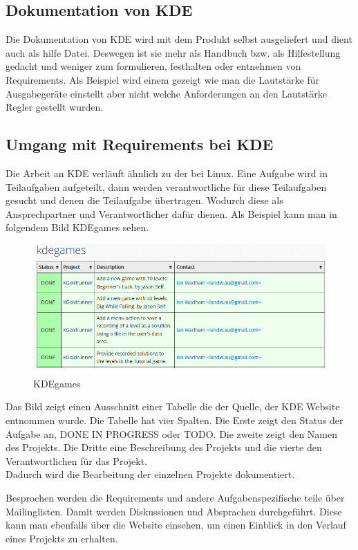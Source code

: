 \documentclass[10pt,a4paper,twocolumn]{article}
\begin{document}
\subsection{Dokumentation von KDE}
Die Dokumentation von KDE wird mit dem Produkt selbst ausgeliefert und dient
auch als hilfe Datei. Deswegen ist sie mehr als Handbuch bzw. als Hilfestellung
gedacht und weniger zum formulieren, festhalten oder entnehmen von Requirements.
Als Beispiel wird einem gezeigt wie man die Lautstärke für Ausgabegeräte
einstellt aber nicht welche Anforderungen an den Lautstärke Regler gestellt
wurden\cite{4}.

\subsection{Umgang mit Requirements bei KDE}
Die Arbeit an KDE verläuft ähnlich zu der bei Linux. Eine Aufgabe wird in
Teilaufgaben aufgeteilt, dann werden verantwortliche für diese Teilaufgaben
gesucht und denen die Teilaufgabe übertragen. Wodurch diese als Ansprechpartner
und Verantwortlicher dafür dienen. Als Beispiel kann man in folgendem Bild
KDEgames sehen.
%
\begin{figure}[h]
\includegraphics[width=\columnwidth]{images/KDE_games.png}
\caption{KDEgames\cite{5}}
\end{figure}
Das Bild zeigt einen Ausschnitt einer Tabelle die der Quelle, der KDE
Website entnommen wurde\cite{5}.
Die Tabelle hat vier Spalten. Die Erste zeigt den Status der Aufgabe an, DONE
IN PROGRESS oder TODO. Die zweite zeigt den Namen des Projekts. Die Dritte eine Beschreibung des Projekts und die vierte den Verantwortlichen für das Projekt.\\
Dadurch wird die Bearbeitung der einzelnen Projekte dokumentiert.

Besprochen werden die Requirements und andere Aufgabenspezifische teile über Mailinglisten. Damit werden Diskussionen und Absprachen durchgeführt.
Diese kann man ebenfalls über die Website einsehen, um einen Einblick in den
Verlauf eines Projekts zu erhalten.
\end{document}
